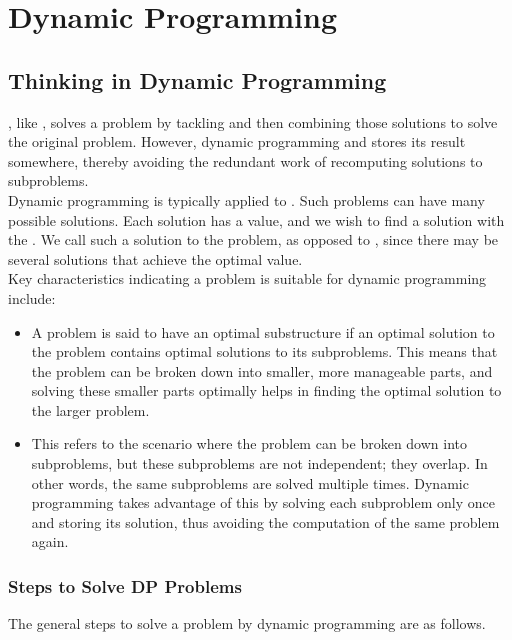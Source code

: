\chapter{Dynamic Programming}
\section{Thinking in Dynamic Programming}
{\color{blue}{Dynamic programming}}, like {\color{blue}{recursion}}, solves a problem by tackling {\color{blue}{smaller versions of the same problem}} and then combining those solutions to solve the original problem. However, dynamic programming {\color{blue}{solves each subproblem only once}} and stores its result somewhere, thereby avoiding the redundant work of recomputing solutions to subproblems. \\

Dynamic programming is typically applied to {\color{blue}{optimization problems}}. Such problems can have many possible solutions. Each solution has a value, and we wish to ﬁnd a solution with the {\color{blue}{optimal value}}. We call such a solution {\color{blue}{an optimal solution}} to the problem, as opposed to {\color{blue}{the optimal solution}}, since there may be several solutions that achieve the optimal value.\\

Key characteristics indicating a problem is suitable for dynamic programming include:
\begin{itemize}
	\item {\color{blue}{[Optimal substructure]}} A problem is said to have an optimal substructure if an optimal solution to the problem contains optimal solutions to its subproblems. This means that the problem can be broken down into smaller, more manageable parts, and solving these smaller parts optimally helps in finding the optimal solution to the larger problem.
	\item {\color{blue}{[Overlapping subproblems]}} This refers to the scenario where the problem can be broken down into subproblems, but these subproblems are not independent; they overlap. In other words, the same subproblems are solved multiple times. Dynamic programming takes advantage of this by solving each subproblem only once and storing its solution, thus avoiding the computation of the same problem again.
\end{itemize}

\subsection{Steps to Solve DP Problems}
The general steps to solve a problem by dynamic programming are as follows.

